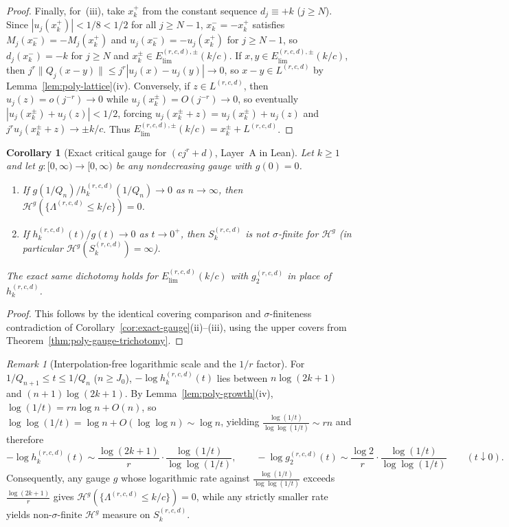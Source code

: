 \documentclass[11pt]{article}
\newtheorem{corollary}[theorem]{Corollary}
\theoremstyle{definition}
\theoremstyle{remark}
\newtheorem{remark}[theorem]{Remark}
\newcommand{\Lam}{\Lambda}
\begin{document}
\begin{proof}
Finally, for~(iii), take $x_k^+$ from the constant sequence $d_j\equiv+k$ ($j\ge N$).
Since $|u_j(x_k^+)|<1/8<1/2$ for all $j\ge N-1$, $x_k^-=-x_k^+$ satisfies
$M_j(x_k^-)=-M_j(x_k^+)$ and $u_j(x_k^-)=-u_j(x_k^+)$ for $j\ge N-1$, so
$d_j(x_k^-)=-k$ for $j\ge N$ and $x_k^\pm\in E_{\mathrm{lim}}^{(r,c,d),\pm}(k/c)$.
If $x,y\in E_{\mathrm{lim}}^{(r,c,d),\pm}(k/c)$, then
$j^r\|Q_j(x-y)\|\le j^r|u_j(x)-u_j(y)|\to0$, so $x-y\in L^{(r,c,d)}$ by
Lemma~\ref{lem:poly-lattice}(iv). Conversely, if $z\in L^{(r,c,d)}$, then
$u_j(z)=o(j^{-r})\to0$ while $u_j(x_k^\pm)=O(j^{-r})\to0$, so eventually
$|u_j(x_k^\pm)+u_j(z)|<1/2$, forcing $u_j(x_k^\pm+z)=u_j(x_k^\pm)+u_j(z)$ and
$j^ru_j(x_k^\pm+z)\to\pm k/c$. Thus $E_{\mathrm{lim}}^{(r,c,d),\pm}(k/c)=x_k^\pm+L^{(r,c,d)}$.
\end{proof}

\begin{corollary}[Exact critical gauge for $(cj^r+d)$, Layer~A in Lean]\label{cor:poly-exact-gauge}
Let $k\ge1$ and let $g:[0,\infty)\to[0,\infty)$ be any nondecreasing gauge with $g(0)=0$.
\begin{enumerate}[label=(\roman*),leftmargin=2em]
\item If $g(1/Q_n)/h_k^{(r,c,d)}(1/Q_n)\to0$ as $n\to\infty$, then
$\mathcal H^g(\{\Lam^{(r,c,d)}\le k/c\})=0$.
\item If $h_k^{(r,c,d)}(t)/g(t)\to0$ as $t\to0^+$, then $S_k^{(r,c,d)}$ is not
$\sigma$-finite for $\mathcal H^g$ (in particular $\mathcal H^g(S_k^{(r,c,d)})=\infty$).
\end{enumerate}
The exact same dichotomy holds for $E_{\mathrm{lim}}^{(r,c,d)}(k/c)$ with
$g_2^{(r,c,d)}$ in place of $h_k^{(r,c,d)}$.
\end{corollary}

\begin{proof}
This follows by the identical covering comparison and $\sigma$-finiteness
contradiction of Corollary~\ref{cor:exact-gauge}(ii)--(iii), using the upper
covers from Theorem~\ref{thm:poly-gauge-trichotomy}.
\end{proof}

\begin{remark}[Interpolation-free logarithmic scale and the $1/r$ factor]\label{rem:poly-gauge-scale}
For $1/Q_{n+1}\le t\le 1/Q_n$ ($n\ge J_0$), $-\log h_k^{(r,c,d)}(t)$ lies between
$n\log(2k+1)$ and $(n+1)\log(2k+1)$. By Lemma~\ref{lem:poly-growth}(iv),
$\log(1/t)=rn\log n+O(n)$, so $\log\log(1/t)=\log n+O(\log\log n)\sim\log n$,
yielding $\frac{\log(1/t)}{\log\log(1/t)}\sim rn$ and therefore
\[
-\log h_k^{(r,c,d)}(t)\sim\frac{\log(2k+1)}{r}\cdot\frac{\log(1/t)}{\log\log(1/t)},\qquad
-\log g_2^{(r,c,d)}(t)\sim\frac{\log2}{r}\cdot\frac{\log(1/t)}{\log\log(1/t)}
\qquad(t\downarrow0).
\]
Consequently, any gauge $g$ whose logarithmic rate against
$\frac{\log(1/t)}{\log\log(1/t)}$ exceeds $\frac{\log(2k+1)}{r}$ gives
$\mathcal H^g(\{\Lam^{(r,c,d)}\le k/c\})=0$, while any strictly smaller rate
yields non-$\sigma$-finite $\mathcal H^g$ measure on $S_k^{(r,c,d)}$.
\end{remark}
\end{document}
